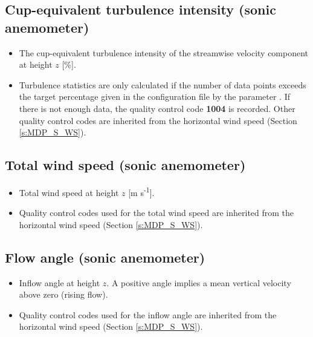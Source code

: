 \subsection{Cup-equivalent turbulence intensity (sonic anemometer)}
\begin{itemize}
\item {} The cup-equivalent turbulence intensity of the streamwise velocity component at height $z$ [\%].  
\item {} Turbulence statistics are only calculated if the number of data points exceeds the target percentage given in the configuration file by the parameter . If there is not enough data, the quality control code \textbf{1004} is recorded. Other quality control codes are inherited from the horizontal wind speed (Section \ref{s:MDP_S_WS}).
\end{itemize}

\subsection{Total wind speed (sonic anemometer)}
\begin{itemize}
\item {} Total wind speed at height $z$ [m s\textsuperscript{-1}].
\item {} Quality control codes used for the total wind speed are inherited from the horizontal wind speed (Section \ref{s:MDP_S_WS}).
\end{itemize}

\subsection{Flow angle (sonic anemometer)}
\begin{itemize}
\item {} Inflow angle at height $z$. A positive angle implies a mean vertical velocity above zero (rising flow).
\item {} Quality control codes used for the inflow angle are inherited from the horizontal wind speed (Section \ref{s:MDP_S_WS}).
\end{itemize}

